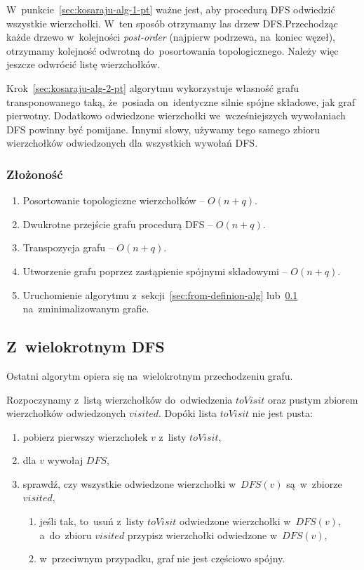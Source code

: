 \documentclass[a4paper,12pt]{mwart}
\begin{document}
W~punkcie~\ref{sec:kosaraju-alg-1-pt} ważne jest, aby procedurą DFS odwiedzić
wszystkie wierzchołki. W~ten sposób otrzymamy las drzew DFS.\@ Przechodząc
każde drzewo w~kolejności \emph{post-order} (najpierw podrzewa, na~koniec
węzeł), otrzymamy kolejność odwrotną do~posortowania topologicznego. Należy
więc jeszcze odwrócić listę wierzchołków.

Krok~\ref{sec:kosaraju-alg-2-pt} algorytmu wykorzystuje własność grafu
transponowanego taką, że~posiada on~identyczne silnie spójne składowe, jak graf
pierwotny. Dodatkowo odwiedzone wierzchołki we~wcześniejszych wywołaniach DFS
powinny być pomijane. Innymi słowy, używamy tego samego zbioru wierzchołków
odwiedzonych dla wszystkich wywołań DFS.

\subsubsection{Złożoność}

\begin{enumerate}
\item Posortowanie topologiczne wierzchołków -- $O(n + q)$.
\item Dwukrotne przejście grafu procedurą DFS -- $O(n + q)$.
\item Transpozycja grafu -- $O(n + q)$.
\item Utworzenie grafu poprzez zastąpienie spójnymi składowymi -- $O(n + q)$.
\item Uruchomienie algorytmu z~sekcji~\ref{sec:from-definion-alg}
  lub~\ref{sec:multiple-dfs} na~zminimalizowanym grafie.
\end{enumerate}

\subsection{Z~wielokrotnym DFS}
\label{sec:multiple-dfs}

Ostatni algorytm opiera się na~wielokrotnym przechodzeniu grafu.

Rozpoczynamy z~listą wierzchołków do~odwiedzenia $toVisit$ oraz pustym zbiorem
wierzchołków odwiedzonych $visited$. Dopóki lista $toVisit$ nie jest pusta:
\begin{enumerate}
\item pobierz pierwszy wierzchołek $v$ z~listy $toVisit$,
\item dla $v$ wywołaj $DFS$,
\item\label{item:multiple-dfs:cond} sprawdź, czy wszystkie odwiedzone
  wierzchołki w~$DFS(v)$ są~w~zbiorze $visited$,
\begin{enumerate}[label*=\arabic*.]
\item jeśli tak, to~usuń z~listy $toVisit$ odwiedzone wierzchołki w~$DFS(v)$,
  a~do~zbioru $visited$ przypisz wierzchołki odwiedzone w~$DFS(v)$,
\item w~przeciwnym przypadku, graf nie jest częściowo spójny.
\end{enumerate}
\end{enumerate}
\end{document}
